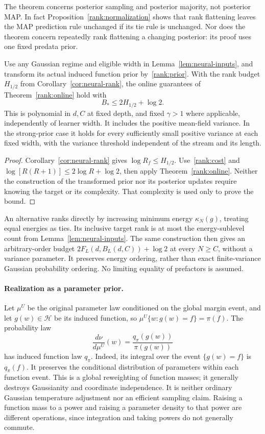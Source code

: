 The theorem concerns posterior sampling and posterior majority, not
posterior MAP. In fact Proposition~\ref{rank:normalization} shows that
rank flattening leaves the MAP prediction rule unchanged if its tie
rule is unchanged. Nor does the theorem concern repeatedly rank
flattening a changing posterior: its proof uses one fixed predata prior.

\begin{corollary}
\label{rank:neural}
Use any Gaussian regime and eligible width in
Lemma~\ref{lem:neural-inputs}, and transform its actual induced function
prior by~\eqref{rank:prior}. With the rank budget $H_{1/2}$ from
Corollary~\ref{cor:neural-rank}, the online guarantees of
Theorem~\ref{rank:online} hold with
\[
 B_*\le 2H_{1/2}+\log2.
\]
This is polynomial in $d,C$ at fixed depth, and fixed $\gamma>1$ where
applicable, independently of learner width. It includes the positive
mean-field variance. In the strong-prior case it holds for every
sufficiently small positive variance at each fixed width, with the
variance threshold independent of the stream and its length.
\end{corollary}
\begin{proof}
Corollary~\ref{cor:neural-rank} gives $\log R_f\le H_{1/2}$.
Use~\eqref{rank:cost} and
$\log[R(R+1)]\le2\log R+\log2$, then apply
Theorem~\ref{rank:online}. Neither the construction of the transformed
prior nor its posterior updates require knowing the target or its
complexity. That complexity is used only to prove the bound.
\end{proof}

An alternative ranks directly by increasing minimum energy
$\kappa_N(g)$, treating equal energies as ties. Its inclusive target rank
is at most the energy-sublevel count from Lemma~\ref{lem:neural-inputs}.
The same construction then gives an arbitrary-order budget
$2F_L(d,B_L(d,C))+\log2$ at every $N\ge C$, without a variance parameter.
It preserves energy ordering, rather than exact finite-variance Gaussian
probability ordering. No limiting equality of prefactors is assumed.

\paragraph{Realization as a parameter prior.}
Let $\mu^U$ be the original parameter law conditioned on the global
margin event, and let $g(w)\in\mathcal H$ be its induced function, so
$\mu^U\{w:g(w)=f\}=\pi(f)$. The probability law
\begin{equation}\label{rank:lift}
 \frac{d\nu}{d\mu^U}(w)=\frac{q_\pi(g(w))}{\pi(g(w))}
\end{equation}
has induced function law $q_\pi$. Indeed, its integral over the event
$\{g(w)=f\}$ is $q_\pi(f)$. It preserves the conditional distribution
of parameters within each function event. This is a global reweighting
of function masses; it generally destroys Gaussianity and coordinate
independence. It is neither ordinary Gaussian temperature adjustment nor
an efficient sampling claim. Raising a function mass to a power and
raising a parameter density to that power are different operations,
since integration and taking powers do not generally commute.

